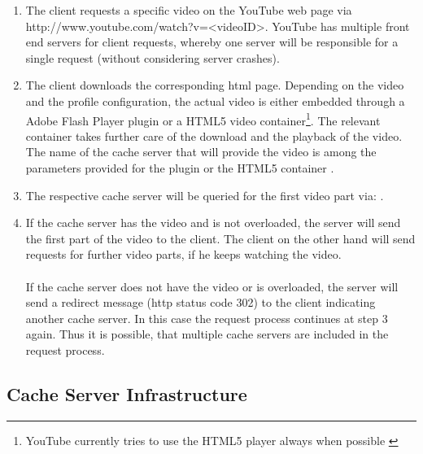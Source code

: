 \begin{enumerate}
  \item The client requests a specific video on the YouTube web page via http://www.youtube.com/watch?v=<videoID>. YouTube has multiple front end servers for client requests, whereby one server will be responsible for a single request (without considering server crashes).
  
  \item The client downloads the corresponding \gls{html} page. Depending on the video and the profile configuration, the actual video is either embedded through a Adobe Flash Player plugin or a HTML5 video container\footnote{YouTube currently tries to use the HTML5 player always when possible \cite{misc:youtube_html5}}. The relevant container takes further care of the download and the playback of the video. The name of the cache server that will provide the video is among the parameters provided for the plugin or the HTML5 container \cite{inpr:server_selection}.
  
  \item The respective cache server will be queried for the first video part via: . 

  \item If the cache server has the video and is not overloaded, the server will send the first part of the video to the client. The client on the other hand will send requests for further video parts, if he keeps watching the video. \\
\\
If the cache server does not have the video or is overloaded, the server will send a redirect message (\gls{http} status code 302) to the client indicating another cache server. In this case the request process continues at step 3 again. Thus it is possible, that multiple cache servers are included in the request process.
\end{enumerate}

\subsection{Cache Server Infrastructure}

